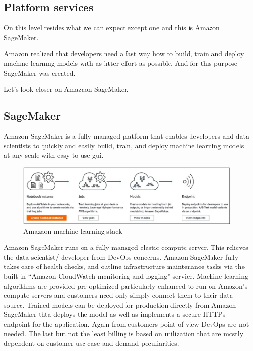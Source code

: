 \documentclass[thesis=M,english]{FITthesis}[2012/06/26]
\begin{document}
\subsection{Platform services}

On this level resides what we can expect except one and this is Amazon SageMaker.

Amazon realized that developers need a fast way how to build, train and deploy machine learning models with as litter effort as possible. And for this purpose SageMaker was created.

Let's look closer on Amazaon SageMaker.

\subsection{SageMaker} 

Amazon SageMaker is a fully-managed platform that enables developers and data scientists to quickly and easily build, train, and deploy machine learning models at any scale with easy to use \acrshort{gui}.\\

\begin{figure}[h!]\centering
	\includegraphics[width=1\textwidth]{pictures/ml_aws_sagemaker_buildprocess}
	\caption{Amazaon machine learning stack \cite{ml_aws}}\label{fig:ml_aws_sagemaker_buildprocess}
\end{figure}

Amazon SageMaker runs on a fully managed elastic compute server. This relieves the data scientist/ developer from DevOps concerns. Amazon SageMaker fully takes care of health checks, and outline infrastructure maintenance tasks via the built-in “Amazon CloudWatch monitoring and logging” service. Machine learning algorithms are provided pre-optimized particularly enhanced to run on Amazon’s compute servers and customers need only simply connect them to their data source. 
Trained models can be deployed for production directly from Amazon SageMaker thta deploys the model as well as implements a secure HTTPs endpoint for the application. Again from customers point of view DevOps are not needed. 
The last but not the least billing is based on utilization that are mostly dependent on customer use-case and demand peculiarities.
\end{document}
